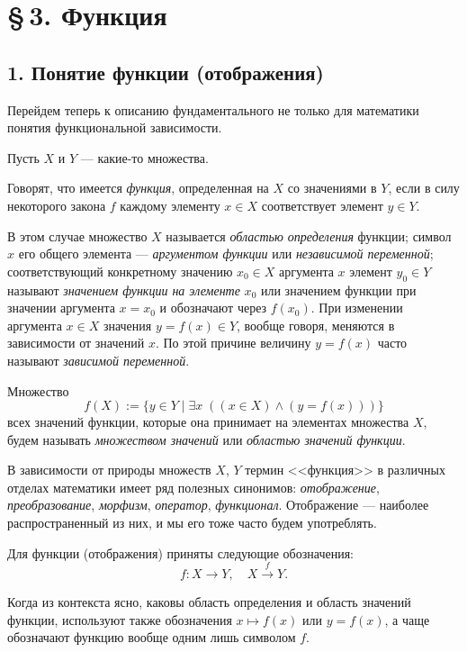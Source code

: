 
\section*{\S\,3. Функция}

\subsection*{1. Понятие функции (отображения)}

Перейдем теперь к описанию фундаментального не только для математики понятия функциональной зависимости.

Пусть $X$ и $Y$ --- какие-то множества.

Говорят, что имеется \textit{функция}, определенная на $X$ со значениями в $Y$,
если в силу некоторого закона $f$ каждому элементу $x \in X$ соответствует элемент
$y \in Y$.

В этом случае множество $X$ называется \textit{областью определения} функции;
символ $x$ его общего элемента --- \textit{аргументом функции} или \textit{независимой переменной};
соответствующий конкретному значению $x_0 \in X$ аргумента $x$ элемент
$y_0 \in Y$ называют \textit{значением функции на элементе} $x_0$ или значением
функции при значении аргумента $x = x_0$ и обозначают через $f(x_0)$. При изменении
аргумента $x \in X$ значения $y = f(x) \in Y$, вообще говоря, меняются в
зависимости от значений $x$. По этой причине величину $y = f(x)$ часто называют
\textit{зависимой переменной}.

Множество
\[
  f(X) := \{ y \in Y \mid \exists x\; ((x \in X) \land (y = f(x))) \}
\]
всех значений функции, которые она принимает на элементах множества $X$,
будем называть \textit{множеством значений} или \textit{областью значений функции}.

В зависимости от природы множеств $X$, $Y$ термин <<функция>> в различных
отделах математики имеет ряд полезных синонимов: \textit{отображение}, \textit{преобразование}, \textit{морфизм}, \textit{оператор}, \textit{функционал}. Отображение --- наиболее распространенный из них, и мы его тоже часто будем употреблять.

Для функции (отображения) приняты следующие обозначения:
\[
  f \colon X \to Y, \quad X \xrightarrow{f} Y.
\]

Когда из контекста ясно, каковы область определения и область значений
функции, используют также обозначения $x \mapsto f(x)$ или $y = f(x)$, а чаще обозначают функцию вообще одним лишь символом $f$.

